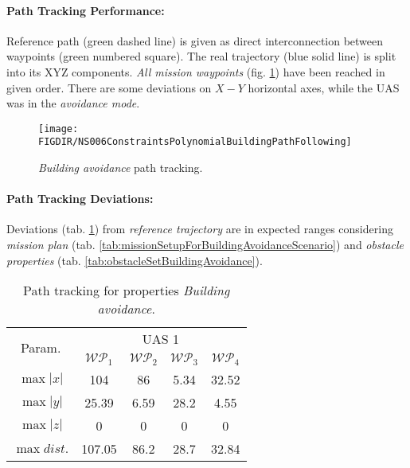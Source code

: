 \noindent\paragraph{Path Tracking Performance:} Reference path (green dashed line) is given as direct interconnection between waypoints (green numbered square).  The real trajectory (blue solid line) is split into its XYZ components. \emph{All mission waypoints} (fig. \ref{fig:testCaseBuildingAvoidancePathTracking}) have been reached in given order. There are some deviations on $X-Y$ horizontal axes, while the UAS was in the \emph{avoidance mode}.

\begin{figure}[H]
	\centering
	\texttt{[image: \\FIGDIR/NS006ConstraintsPolynomialBuildingPathFollowing]} 
	\caption{\emph{Building avoidance} path tracking.}
	\label{fig:testCaseBuildingAvoidancePathTracking}
\end{figure}



\noindent\paragraph{Path Tracking Deviations:} Deviations (tab. \ref{tab:pathTrackingParametersForBuildingAvoidance}) from \emph{reference trajectory} are in expected ranges considering \emph{mission plan} (tab. \ref{tab:missionSetupForBuildingAvoidanceScenario}) and \emph{obstacle properties} (tab. \ref{tab:obstacleSetBuildingAvoidance}).
\begin{table}[H]
	\centering
	\begin{tabular}{c||c|c|c|c}
		\multirow{2}{*}{Param.} & \multicolumn{4}{c}{UAS 1} \\\cline{2-5}
						& $\mathscr{WP}_1$  & $\mathscr{WP_2}$  & $\mathscr{WP}_3$  & $\mathscr{WP}_4$  \\\hline\hline
		  $\max |x|$    & 104      & 86      & 5.34       & 32.52 \\\hline
		  $\max |y|$    & 25.39      & 6.59       & 28.2      & 4.55 \\\hline
		  $\max |z|$    & 0      & 0      &   0    & 0 \\\hline
		  $\max dist.$  & 107.05       & 86.2      & 28.7       & 32.84 \\
	\end{tabular}
	\caption{Path tracking for properties \emph{Building avoidance}.}
	\label{tab:pathTrackingParametersForBuildingAvoidance}
\end{table}


